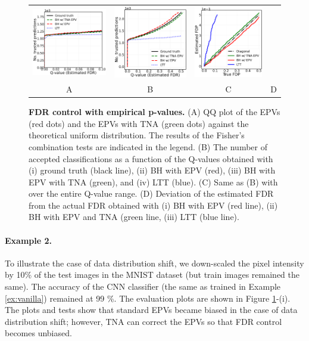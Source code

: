 \documentclass{article}
\begin{document}
\begin{figure}[h!]
\begin{tabular}{cccc}
		\includegraphics[width=1.72in]{img/cnn_balanced_fdr_control_loc.png} &
		\includegraphics[width=1.7in]{img/cnn_balanced_fdr_control.png} & 
		\includegraphics[width=1.59in]{img/cnn_FDPscat_balanced.png} \\		

		A & B & C & D \\
	\end{tabular}
	\caption{{\bf  FDR control with empirical p-values.}
		(A) QQ plot of the EPVs (red dots) and the EPVs with TNA (green dots) against the theoretical uniform distribution. The results of the Fisher's combination tests are indicated in the legend. (B) The number of accepted classifications as a function of the Q-values obtained with (i) ground truth (black line), (ii) BH with EPV (red), (iii) BH with EPV with TNA (green), and (iv) LTT (blue). (C) Same as (B) with over the entire Q-value range. (D) Deviation of the estimated FDR from the actual FDR obtained with (i) BH with EPV (red line), (ii) BH with EPV and TNA (green line, (iii) LTT (blue line).}
	\label{fig:mnist_shfit}
\end{figure}

	
\paragraph{Example 2.} To illustrate the case of data distribution shift, we down-scaled the pixel intensity by 10\% of the test images in the MNIST dataset (but train images remained the same). The accuracy of the CNN classifier (the same as trained in Example \ref{ex:vanilla}) remained at 99 \%. The evaluation plots are shown in Figure \ref{fig:mnist_shfit}-(i). The plots and tests show that standard EPVs became biased in the case of data distribution shift; however, TNA can correct the EPVs so that FDR control becomes unbiased.
\end{document}
